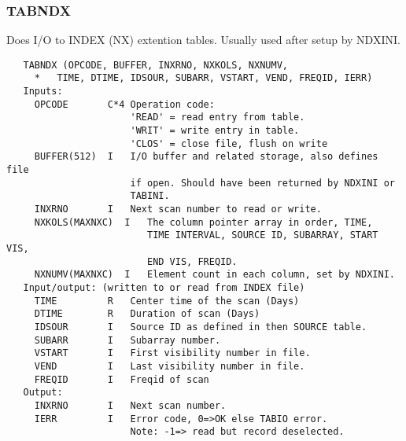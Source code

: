 \subsubsection{TABNDX}
Does I/O to INDEX (NX) extention tables. Usually used after setup by
NDXINI.
\begin{verbatim}
   TABNDX (OPCODE, BUFFER, INXRNO, NXKOLS, NXNUMV,
     *   TIME, DTIME, IDSOUR, SUBARR, VSTART, VEND, FREQID, IERR)
   Inputs:
     OPCODE       C*4 Operation code:
                      'READ' = read entry from table.
                      'WRIT' = write entry in table.
                      'CLOS' = close file, flush on write
     BUFFER(512)  I   I/O buffer and related storage, also defines file
                      if open. Should have been returned by NDXINI or
                      TABINI.
     INXRNO       I   Next scan number to read or write.
     NXKOLS(MAXNXC)  I   The column pointer array in order, TIME,
                         TIME INTERVAL, SOURCE ID, SUBARRAY, START VIS,
                         END VIS, FREQID.
     NXNUMV(MAXNXC)  I   Element count in each column, set by NDXINI.
   Input/output: (written to or read from INDEX file)
     TIME         R   Center time of the scan (Days)
     DTIME        R   Duration of scan (Days)
     IDSOUR       I   Source ID as defined in then SOURCE table.
     SUBARR       I   Subarray number.
     VSTART       I   First visibility number in file.
     VEND         I   Last visibility number in file.
     FREQID       I   Freqid of scan
   Output:
     INXRNO       I   Next scan number.
     IERR         I   Error code, 0=>OK else TABIO error.
                      Note: -1=> read but record deselected.
\end{verbatim}

